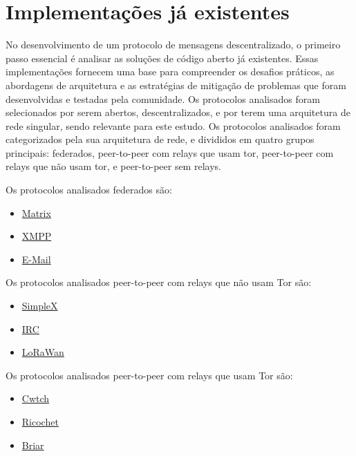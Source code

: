 
\chapter{Implementações já existentes}

No desenvolvimento de um protocolo de mensagens descentralizado, o primeiro passo essencial é analisar as soluções de código aberto já existentes. Essas implementações fornecem uma base para compreender os desafios práticos, as abordagens de arquitetura e as estratégias de mitigação de problemas que foram desenvolvidas e testadas pela comunidade. Os protocolos analisados foram selecionados por serem abertos, descentralizados, e por terem uma arquitetura de rede singular, sendo relevante para este estudo. Os protocolos analisados foram categorizados pela sua arquitetura de rede, e divididos em quatro grupos principais: federados, peer-to-peer com relays que usam tor, peer-to-peer com relays que não usam tor, e peer-to-peer sem relays. 

Os protocolos analisados federados são:
\begin{itemize}
  \item \href{https://matrix.org/}{Matrix}
  \item \href{https://xmpp.org/}{XMPP}
  \item \href{https://en.wikipedia.org/wiki/Email}{E-Mail}
\end{itemize}

Os protocolos analisados peer-to-peer com relays que não usam Tor são:
\begin{itemize}
  \item \href{https://simplex.chat/}{SimpleX}
  \item \href{https://www.irc.org/}{IRC}
  \item \href{https://lora-alliance.org/}{LoRaWan}
\end{itemize}

Os protocolos analisados peer-to-peer com relays que usam Tor são:
\begin{itemize}
  \item \href{https://cwtch.im/}{Cwtch}
  \item \href{https://ricochet.im/}{Ricochet}
  \item \href{https://briarproject.org/}{Briar}
\end{itemize}

